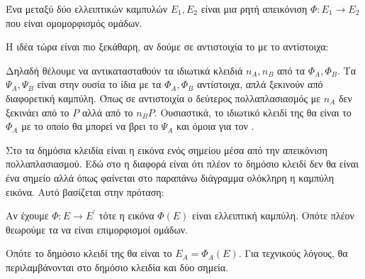 \documentclass[oneside,a4paper]{article}
\begin{document}
\begin{defn}[\tl{Isogeny}]
	Ένα  μεταξύ δύο ελλειπτικών καμπυλών $E_1,E_2$ είναι μια ρητή απεικόνιση $\Phi: E_1 \rightarrow E_2$ που είναι ομομορφισμός ομάδων.
\end{defn}

Η ιδέα τώρα είναι πιο ξεκάθαρη, αν δούμε σε αντιστοιχία το  με το  αντίστοιχα:

\begin{figure}[H]
	\centering
\end{figure}


\begin{figure}[H]
	\centering
{}
\end{figure}
Δηλαδή θέλουμε να αντικατασταθούν τα ιδιωτικά κλειδιά $n_A, n_B$ από τα  $\Phi_A, \Phi_B$. Τα $\Psi_A, \Psi_B$ είναι στην ουσία το ίδια με τα $\Phi_A, \Phi_B$ αντίστοιχα, απλά ξεκινούν από διαφορετική καμπύλη. Όπως σε αντιστοιχία ο δεύτερος πολλαπλασιασμός με $n_A$ δεν ξεκινάει από το $P$ αλλά από το $n_B P$.  Ουσιαστικά, το ιδιωτικό κλειδί της  θα είναι το $\Phi_A$ με το οποίο θα μπορεί να βρει το $\Psi_A$ και όμοια για τον .


Στο  τα δημόσια κλειδία είναι η εικόνα ενός σημείου μέσα από την απεικόνιση πολλαπλασιασμού. Εδώ στο  η διαφορά είναι ότι πλέον το δημόσιο κλειδί δεν θα είναι ένα σημείο αλλά όπως φαίνεται στο παραπάνω διάγραμμα ολόκληρη η καμπύλη εικόνα. Αυτό βασίζεται στην πρόταση:
\begin{prop}
	Αν έχουμε  $\Phi:E \rightarrow E^{\prime}$ τότε η εικόνα $\Phi(E)$ είναι ελλειπτική καμπύλη. Οπότε πλέον θεωρούμε τα  να είναι επιμορφισμοί ομάδων.
\end{prop}
Οπότε το δημόσιο κλειδί της  θα είναι το $E_A = \Phi_A(E)$. Για τεχνικούς λόγους, θα περιλαμβάνονται στο δημόσιο κλειδία και δύο σημεία.
\end{document}
